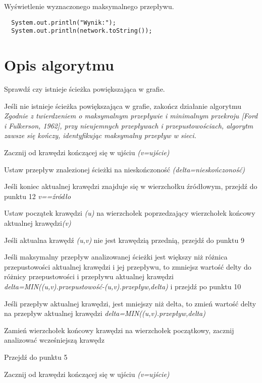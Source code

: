 \documentclass[10pt]{minutes}
\begin{document}
Wyświetlenie wyznaczonego maksymalnego przepływu.
\begin{lstlisting}        
  System.out.println("Wynik:");
  System.out.println(network.toString());
\end{lstlisting}
       
\section{Opis algorytmu}
\begin{enumerate}
\item{Sprawdź czy istnieje ścieżka powiększająca w grafie.}
\item{Jeśli nie istnieje ścieżka powiększająca w grafie, zakończ działanie algorytmu}
\\\emph{Zgodnie z twierdzeniem o maksymalnym przepływie i minimalnym przekroju [Ford i Fulkerson, 1962], przy nieujemnych przepływach i przepustowościach, algorytm zawsze się kończy, identyfikując maksymalny przepływ w sieci.}
\item{Zacznij od krawędzi kończącej się w ujściu \emph{(v=ujście)}
\item{Ustaw przepływ znalezionej ścieżki na nieskończoność \emph{(delta=nieskończoność)}
\item{Jeśli koniec aktualnej krawędzi znajduje się w wierzchołku źródłowym, przejdź do punktu 12 \emph{v==źródło}}
\item{Ustaw początek krawędzi \emph{(u)} na wierzchołek poprzedzający wierzchołek końcowy aktualnej krawędzi\emph{(v)}}
\item{Jeśli aktualna krawędź \emph{(u,v)} nie jest krawędzią przednią, przejdź do punktu 9}
\item{Jeśli maksymalny przepływ analizowanej ścieżki jest większy niż różnica przepustowości aktualnej krawędzi i jej przepływu, to zmniejsz wartość delty do różnicy przepustowości i przepływu aktualnej krawędzi \emph{delta=MIN((u,v).przepustowość-(u,v).przepływ,delta)} i przejdź po punktu 10}
\item{Jeśli przepływ aktualnej krawędzi, jest mniejszy niż delta, to zmień wartość delty na przepływ aktualnej krawędzi \emph{delta=MIN((u,v).przepływ,delta)}}
\item{Zamień wierzchołek końcowy krawędzi na wierzchołek początkowy, zacznij analizować wcześniejszą krawędz}
\item{Przejdź do punktu 5}
\item{Zacznij od krawędzi kończącej się w ujściu \emph{(v=ujście)}
}}}
\end{enumerate}
\end{document}
